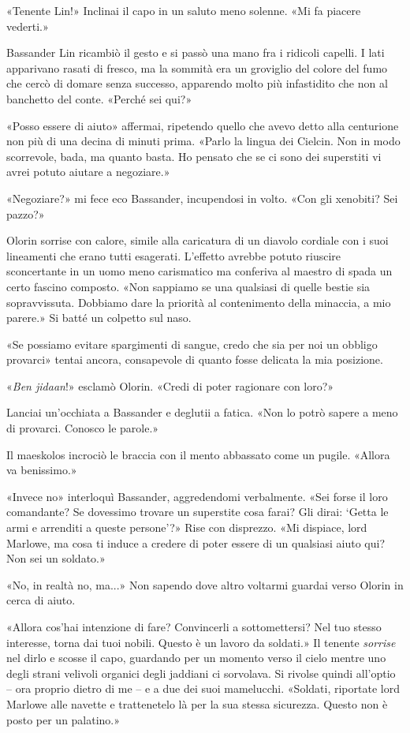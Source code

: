 «Tenente Lin!» Inclinai il capo in un saluto meno solenne. «Mi fa
piacere vederti.»

Bassander Lin ricambiò il gesto e si passò una mano fra i ridicoli
capelli. I lati apparivano rasati di fresco, ma la sommità era un
groviglio del colore del fumo che cercò di domare senza successo,
apparendo molto più infastidito che non al banchetto del conte. «Perché
sei qui?»

«Posso essere di aiuto» affermai, ripetendo quello che avevo detto alla
centurione non più di una decina di minuti prima. «Parlo la lingua dei
Cielcin. Non in modo scorrevole, bada, ma quanto basta. Ho pensato che
se ci sono dei superstiti vi avrei potuto aiutare a negoziare.»

«Negoziare?» mi fece eco Bassander, incupendosi in volto. «Con gli
xenobiti? Sei pazzo?»

Olorin sorrise con calore, simile alla caricatura di un diavolo cordiale
con i suoi lineamenti che erano tutti esagerati. L'effetto avrebbe
potuto riuscire sconcertante in un uomo meno carismatico ma conferiva al
maestro di spada un certo fascino composto. «Non sappiamo se una
qualsiasi di quelle bestie sia sopravvissuta. Dobbiamo dare la priorità
al contenimento della minaccia, a mio parere.» Si batté un colpetto sul
naso.

«Se possiamo evitare spargimenti di sangue, credo che sia per noi un
obbligo provarci» tentai ancora, consapevole di quanto fosse delicata la
mia posizione.

«\emph{Ben jidaan}!» esclamò Olorin. «Credi di poter ragionare con
loro?»

Lanciai un'occhiata a Bassander e deglutii a fatica. «Non lo potrò
sapere a meno di provarci. Conosco le parole.»

Il maeskolos incrociò le braccia con il mento abbassato come un pugile.
«Allora va benissimo.»

«Invece no» interloquì Bassander, aggredendomi verbalmente. «Sei forse
il loro comandante? Se dovessimo trovare un superstite cosa farai? Gli
dirai: `Getta le armi e arrenditi a queste persone'?» Rise con
disprezzo. «Mi dispiace, lord Marlowe, ma cosa ti induce a credere di
poter essere di un qualsiasi aiuto qui? Non sei un soldato.»

«No, in realtà no, ma...» Non sapendo dove altro voltarmi guardai verso
Olorin in cerca di aiuto.

«Allora cos'hai intenzione di fare? Convincerli a sottomettersi? Nel tuo
stesso interesse, torna dai tuoi nobili. Questo è un lavoro da soldati.»
Il tenente \emph{sorrise} nel dirlo e scosse il capo, guardando per un
momento verso il cielo mentre uno degli strani velivoli organici degli
jaddiani ci sorvolava. Si rivolse quindi all'optio -- ora proprio dietro
di me -- e a due dei suoi mamelucchi. «Soldati, riportate lord Marlowe
alle navette e trattenetelo là per la sua stessa sicurezza. Questo non è
posto per un palatino.»

